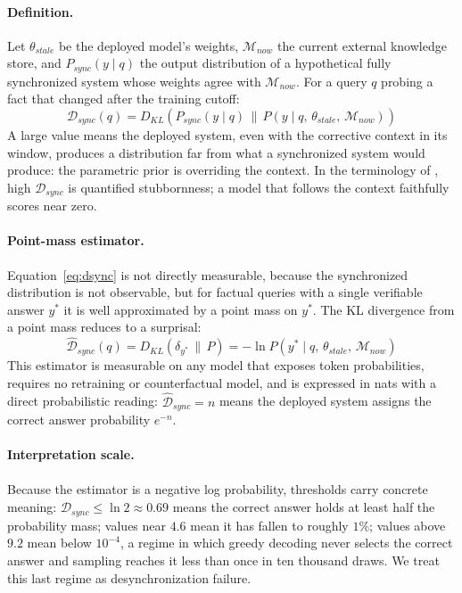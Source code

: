 \documentclass[manuscript, screen, review]{jair}
\begin{document}
\paragraph{Definition.} Let $\theta_{stale}$ be the deployed model's weights, $\mathcal{M}_{now}$ the current external knowledge store, and $P_{sync}(y \mid q)$ the output distribution of a hypothetical fully synchronized system whose weights agree with $\mathcal{M}_{now}$. For a query $q$ probing a fact that changed after the training cutoff:
\begin{equation}
  \label{eq:dsync}
  \mathcal{D}_{sync}(q) = D_{KL}\!\left( P_{sync}(y \mid q) \,\Big\|\, P(y \mid q,\, \theta_{stale},\, \mathcal{M}_{now}) \right)
\end{equation}
A large value means the deployed system, even with the corrective context in its window, produces a distribution far from what a synchronized system would produce: the parametric prior is overriding the context. In the terminology of \citet{xie2024conflicts}, high $\mathcal{D}_{sync}$ is quantified stubbornness; a model that follows the context faithfully scores near zero.

\paragraph{Point-mass estimator.} Equation~\ref{eq:dsync} is not directly measurable, because the synchronized distribution is not observable, but for factual queries with a single verifiable answer $y^*$ it is well approximated by a point mass on $y^*$. The KL divergence from a point mass reduces to a surprisal:
\begin{equation}
  \label{eq:estimator}
  \widehat{\mathcal{D}}_{sync}(q) = D_{KL}\!\left( \delta_{y^*} \,\|\, P \right) = -\ln P\!\left(y^* \mid q,\, \theta_{stale},\, \mathcal{M}_{now}\right)
\end{equation}
This estimator is measurable on any model that exposes token probabilities, requires no retraining or counterfactual model, and is expressed in nats with a direct probabilistic reading: $\widehat{\mathcal{D}}_{sync} = n$ means the deployed system assigns the correct answer probability $e^{-n}$.

\paragraph{Interpretation scale.} Because the estimator is a negative log probability, thresholds carry concrete meaning: $\widehat{\mathcal{D}}_{sync} \leq \ln 2 \approx 0.69$ means the correct answer holds at least half the probability mass; values near $4.6$ mean it has fallen to roughly $1\%$; values above $9.2$ mean below $10^{-4}$, a regime in which greedy decoding never selects the correct answer and sampling reaches it less than once in ten thousand draws. We treat this last regime as desynchronization failure.
\end{document}

